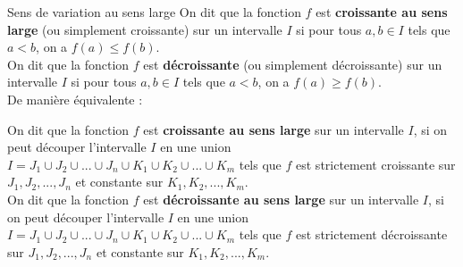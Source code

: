 \documentclass[10pt,a4paper,openany,twoside, eleve]{book}
\begin{document}
\begin{defi}{Sens de variation au sens large}{}
	On dit que la fonction $f$ est \textbf{croissante au sens large} (ou simplement croissante) sur un intervalle $I$ si pour tous $a, b \in I$ tels que $a < b$, on a $f(a) \le f(b)$. \\
	On dit que la fonction $f$ est \textbf{décroissante} (ou simplement décroissante) sur un intervalle $I$ si pour tous $a, b \in I$ tels que $a < b$, on a $f(a) \ge f(b)$. \\

	\vspace{3mm}
	De manière équivalente :

	On dit que la fonction $f$ est \textbf{croissante au sens large} sur un intervalle $I$, si on peut découper l'intervalle $I$ en une union $I = J_1 \cup J_2 \cup ... \cup J_n \cup K_1 \cup K_2 \cup ... \cup K_m$ tels que $f$ est strictement croissante sur $J_1, J_2, ..., J_n$ et constante sur $K_1, K_2, ..., K_m$. \\
	On dit que la fonction $f$ est \textbf{décroissante au sens large} sur un intervalle $I$, si on peut découper l'intervalle $I$ en une union $I = J_1 \cup J_2 \cup ... \cup J_n \cup K_1 \cup K_2 \cup ... \cup K_m$ tels que $f$ est strictement décroissante sur $J_1, J_2, ..., J_n$ et constante sur $K_1, K_2, ..., K_m$. \\
\end{defi}
\end{document}

